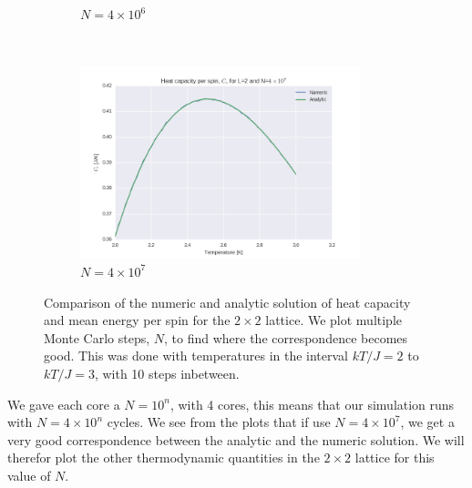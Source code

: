 \documentclass[a4paper, 10pt]{article}
\begin{document}
\begin{figure}[!ht]
\begin{subfigure}[H!]{0.5\textwidth}
        \caption{$N=4\times 10^6$}
    \end{subfigure}%
    ~ 
    \begin{subfigure}[H!]{0.5\textwidth}
        \centering
        \includegraphics[height=2.2in]{L2Cv4e7.png}
        \caption{$N=4\times 10^7$}
    \end{subfigure}
    \caption{Comparison of the numeric and analytic solution of heat capacity and mean energy per spin for the $2\times 2$ lattice. We plot multiple Monte Carlo steps, $N$, to find where the correspondence becomes good. This was done with temperatures in the interval $kT/J=2$ to $kT/J=3$, with 10 steps inbetween.}\label{fig:2x2_nsteps}
\end{figure}


We gave each core a $N = 10^n$, with 4 cores, this means that our simulation runs with  $N = 4 \times 10^n$ cycles. We see from the plots that if use $N = 4 \times 10^7$, we get a very good correspondence between the analytic and the numeric solution. We will therefor plot the other thermodynamic quantities in the $2\times 2$ lattice for this value of $N$. 
\end{document}
